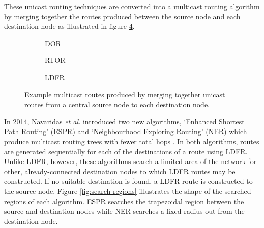 			These unicast routing techniques are converted into a multicast routing
			algorithm by merging together the routes produced between the source node
			and each destination node as illustrated in figure
			\ref{fig:simple-routers}.
			
			\begin{figure}
				\center
				\begin{subfigure}{0.3\linewidth}
					\center
					
					\caption{DOR}
					\label{fig:simple-routers-dor}
				\end{subfigure}
				\begin{subfigure}{0.3\linewidth}
					\center
					
					\caption{RTOR}
					\label{fig:simple-routers-dor}
				\end{subfigure}
				\begin{subfigure}{0.3\linewidth}
					\center
					
					\caption{LDFR}
					\label{fig:simple-routers-dor}
				\end{subfigure}
				
				\caption{Example multicast routes produced by merging together unicast
				routes from a central source node to each destination node.}
				\label{fig:simple-routers}
			\end{figure}
			
			In 2014, Navaridas \emph{et al.} introduced two new algorithms, `Enhanced
			Shortest Path Routing' (ESPR) and `Neighbourhood Exploring Routing' (NER)
			which produce multicast routing trees with fewer total hops
			\cite{navaridas14}. In both algorithms, routes are generated sequentially
			for each of the destinations of a route using LDFR. Unlike LDFR, however,
			these algorithms search a limited area of the network for other,
			already-connected destination nodes to which LDFR routes may be
			constructed. If no suitable destination is found, a LDFR route is
			constructed to the source node. Figure \ref{fig:search-regions} illustrates
			the shape of the searched regions of each algorithm. ESPR searches the
			trapezoidal region between the source and destination nodes while NER
			searches a fixed radius out from the destination node.
			
